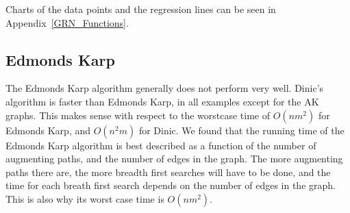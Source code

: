 Charts of the data points and the regression lines can be seen in Appendix~\ref{GRN_Functions}.




\subsection{Edmonds Karp}

The Edmonds Karp algorithm generally does not perform very well.
Dinic's algorithm is faster than Edmonds Karp, in all examples except for the AK graphs. 
This makes sense with respect to the worstcase time of $O(nm^2)$ for Edmonds Karp, and $O(n^2m)$ for Dinic.
We found that the running time of the Edmonds Karp algorithm is best described as a function of the number of augmenting paths, and the number of edges in the graph.
The more augmenting paths there are, the more breadth first searches will have to be done, and the time for each breath first search depends on the number of edges in the graph.
This is also why its worst case time is $O(nm^2)$. 


